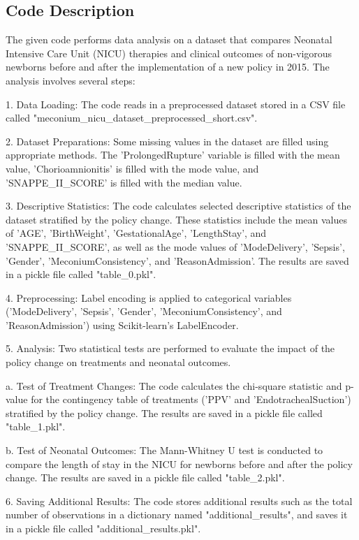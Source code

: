 \documentclass[11pt]{article}
\begin{document}
\subsection{Code Description}

The given code performs data analysis on a dataset that compares Neonatal Intensive Care Unit (NICU) therapies and clinical outcomes of non-vigorous newborns before and after the implementation of a new policy in 2015. The analysis involves several steps:

1. Data Loading: The code reads in a preprocessed dataset stored in a CSV file called "meconium\_nicu\_dataset\_preprocessed\_short.csv".

2. Dataset Preparations: Some missing values in the dataset are filled using appropriate methods. The 'ProlongedRupture' variable is filled with the mean value, 'Chorioamnionitis' is filled with the mode value, and 'SNAPPE\_II\_SCORE' is filled with the median value.

3. Descriptive Statistics: The code calculates selected descriptive statistics of the dataset stratified by the policy change. These statistics include the mean values of 'AGE', 'BirthWeight', 'GestationalAge', 'LengthStay', and 'SNAPPE\_II\_SCORE', as well as the mode values of 'ModeDelivery', 'Sepsis', 'Gender', 'MeconiumConsistency', and 'ReasonAdmission'. The results are saved in a pickle file called "table\_0.pkl".

4. Preprocessing: Label encoding is applied to categorical variables ('ModeDelivery', 'Sepsis', 'Gender', 'MeconiumConsistency', and 'ReasonAdmission') using Scikit-learn's LabelEncoder.

5. Analysis: Two statistical tests are performed to evaluate the impact of the policy change on treatments and neonatal outcomes.

   a. Test of Treatment Changes: The code calculates the chi-square statistic and p-value for the contingency table of treatments ('PPV' and 'EndotrachealSuction') stratified by the policy change. The results are saved in a pickle file called "table\_1.pkl".

   b. Test of Neonatal Outcomes: The Mann-Whitney U test is conducted to compare the length of stay in the NICU for newborns before and after the policy change. The results are saved in a pickle file called "table\_2.pkl".

6. Saving Additional Results: The code stores additional results such as the total number of observations in a dictionary named "additional\_results", and saves it in a pickle file called "additional\_results.pkl".
\end{document}
